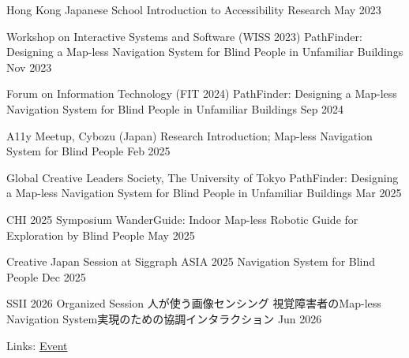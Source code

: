 
\begin{cventries}

  \cventry
    {Hong Kong Japanese School}
    {Introduction to Accessibility Research}
    {}
    {May 2023}
    {}

  \cventry
    {Workshop on Interactive Systems and Software (WISS 2023)}
    {PathFinder: Designing a Map-less Navigation System for Blind People in Unfamiliar Buildings}
    {}
    {Nov 2023}
    {}

  \cventry
    {Forum on Information Technology (FIT 2024)}
    {PathFinder: Designing a Map-less Navigation System for Blind People in Unfamiliar Buildings}
    {}
    {Sep 2024}
    {}

  \cventry
    {A11y Meetup, Cybozu (Japan)}
    {Research Introduction; Map-less Navigation System for Blind People}
    {}
    {Feb 2025}
    {}

  \cventry
    {Global Creative Leaders Society, The University of Tokyo}
    {PathFinder: Designing a Map-less Navigation System for Blind People in Unfamiliar Buildings}
    {}
    {Mar 2025}
    {}

  \cventry
    {CHI 2025 Symposium}
    {WanderGuide: Indoor Map-less Robotic Guide for Exploration by Blind People}
    {}
    {May 2025}
    {}

  \cventry
    {Creative Japan Session at Siggraph ASIA 2025}
    {Navigation System for Blind People}
    {}
    {Dec 2025}
    {}

  \cventry
    {{\jpfont SSII 2026 Organized Session 人が使う画像センシング}}
    {{\jpfont 視覚障害者のMap-less Navigation System実現のための協調インタラクション}}
    {}
    {Jun 2026}
    {
      \begin{cvitems}
        \item {Links: \href{https://pub.confit.atlas.jp/ja/event/ssii2026/content/organized}{Event}}
      \end{cvitems}
    }

\end{cventries}
